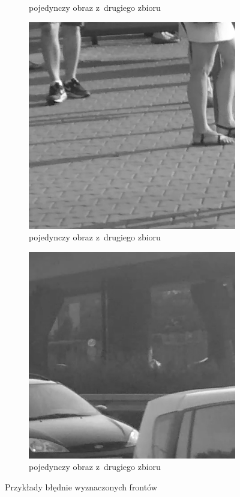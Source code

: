 \begin{figure}[h!]
\begin{subfigure}{.24\linewidth}
		\caption{pojedynczy obraz z~drugiego zbioru}
	\end{subfigure}
	\hfill	
	\begin{subfigure}{.24\linewidth}\centering
		\centering
		\includegraphics[width=1\textwidth]{img/5sessions/02-wrong-07}
		\caption{pojedynczy obraz z~drugiego zbioru}
	\end{subfigure}
	\hfill	
	\begin{subfigure}{.24\linewidth}\centering
		\centering
		\includegraphics[width=1\textwidth]{img/5sessions/02-wrong-01}
		\caption{pojedynczy obraz z~drugiego zbioru}
	\end{subfigure}
	\caption{Przykłady błędnie wyznaczonych frontów}
	\label{fig:5usecasesFrontErrorSamples}
\end{figure}


